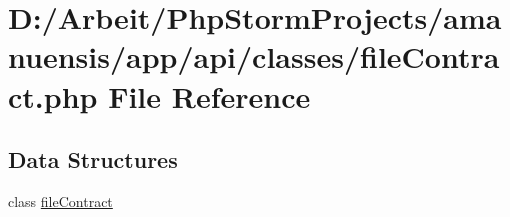 \hypertarget{file_contract_8php}{}\section{D\+:/\+Arbeit/\+Php\+Storm\+Projects/amanuensis/app/api/classes/file\+Contract.php File Reference}
\label{file_contract_8php}
\subsection*{Data Structures}
\begin{DoxyCompactItemize}
\item 
class \hyperlink{classfile_contract}{file\+Contract}
\end{DoxyCompactItemize}
